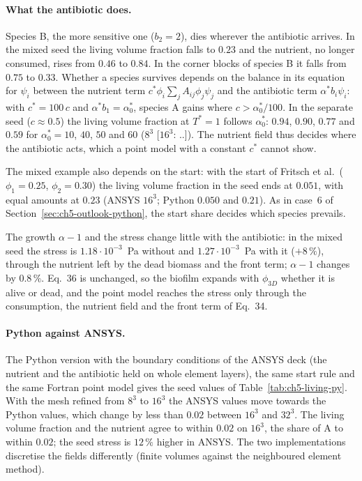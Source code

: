 \paragraph{What the antibiotic does.}
Species B, the more sensitive one ($b_2=2$), dies wherever the antibiotic arrives. In the mixed seed the
living volume fraction falls to $0.23$ and the nutrient, no longer consumed, rises from $0.46$ to $0.84$.
In the corner blocks of species B it falls from $0.75$ to $0.33$. Whether a species survives depends on the
balance in its equation for $\psi_i$ between the nutrient term $c^*\phi_i\sum_jA_{ij}\phi_j\psi_j$ and the
antibiotic term $\alpha^*b_i\psi_i$: with $c^*=100\,c$ and $\alpha^*b_1=\alpha^*_0$, species A gains where
$c>\alpha^*_0/100$. In the separate seed ($c\approx0.5$) the living volume fraction at $T^*=1$ follows
$\alpha^*_0$: $0.94$, $0.90$, $0.77$ and $0.59$ for $\alpha^*_0=10$, $40$, $50$ and $60$ ($8^3$ [$16^3$: ..]). The nutrient field
thus decides where the antibiotic acts, which a point model with a constant $c^*$ cannot show.

The mixed example also depends on the start: with the start of Fritsch et al.\ ($\phi_1=0.25$,
$\phi_2=0.30$) the living volume fraction in the seed ends at $0.051$, with equal amounts at $0.23$ (ANSYS
$16^3$; Python $0.050$ and $0.21$). As in case~6 of Section~\ref{sec:ch5-outlook-python}, the start share decides
which species prevails.

The growth $\alpha-1$ and the stress change little with the antibiotic: in the mixed seed the stress is
$1.18\cdot10^{-3}$~Pa without and $1.27\cdot10^{-3}$~Pa with it ($+8\,\%$), through the nutrient left by the
dead biomass and the front term; $\alpha-1$ changes by $0.8\,\%$. Eq.~36 is unchanged, so the biofilm expands
with $\phi_{3D}$ whether it is alive or dead, and the point model reaches the stress only through the
consumption, the nutrient field and the front term of Eq.~34.

\paragraph{Python against ANSYS.}
The Python version with the boundary conditions of the ANSYS deck (the nutrient and the antibiotic held on
whole element layers), the same start rule and the same Fortran point model gives the seed values of
Table~\ref{tab:ch5-living-py}. With the mesh refined from $8^3$ to $16^3$ the ANSYS values move towards the
Python values, which change by less than $0.02$ between $16^3$ and $32^3$. The living volume fraction and the
nutrient agree to within $0.02$ on $16^3$, the share of A to within $0.02$; the seed stress is
$12\,\%$ higher in ANSYS. The two implementations discretise the fields differently (finite volumes against
the neighboured element method).

